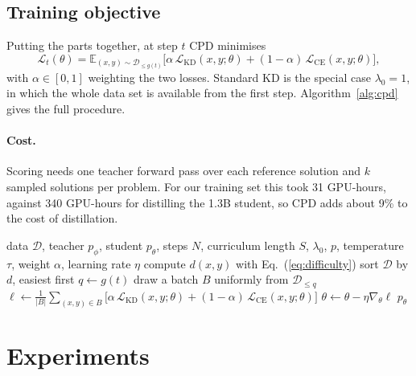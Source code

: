 \documentclass{article} %
\begin{document}
\subsection{Training objective}
\label{sec:objective}

Putting the parts together, at step $t$ CPD minimises
\begin{equation}
\mathcal{L}_t(\theta) = \mathbb{E}_{(x, y) \sim \mathcal{D}_{\le g(t)}} \bigl[ \alpha\, \mathcal{L}_{\mathrm{KD}}(x, y; \theta) + (1 - \alpha)\, \mathcal{L}_{\mathrm{CE}}(x, y; \theta) \bigr],
\label{eq:objective}
\end{equation}
with $\alpha \in [0, 1]$ weighting the two losses.
Standard KD is the special case $\lambda_0 = 1$, in which the whole data set is available from the first step.
Algorithm~\ref{alg:cpd} gives the full procedure.

\paragraph{Cost.}
Scoring needs one teacher forward pass over each reference solution and $k$ sampled solutions per problem.
For our training set this took 31 GPU-hours, against 340 GPU-hours for distilling the 1.3B student, so CPD adds about 9\% to the cost of distillation.

\begin{algorithm}[t]
\caption{Curriculum-Paced Distillation (CPD)}
\label{alg:cpd}
\begin{algorithmic}[1]
\REQUIRE data $\mathcal{D}$, teacher $p_\phi$, student $p_\theta$, steps $N$, curriculum length $S$, $\lambda_0$, $p$, temperature $\tau$, weight $\alpha$, learning rate $\eta$
\STATE compute $d(x, y)$ with Eq.~(\ref{eq:difficulty})
\ENDFOR
\STATE sort $\mathcal{D}$ by $d$, easiest first
\STATE $q \leftarrow g(t)$ 
\STATE draw a batch $B$ uniformly from $\mathcal{D}_{\le q}$
\STATE $\ell \leftarrow \frac{1}{|B|} \sum_{(x, y) \in B} \bigl[ \alpha\, \mathcal{L}_{\mathrm{KD}}(x, y; \theta) + (1 - \alpha)\, \mathcal{L}_{\mathrm{CE}}(x, y; \theta) \bigr]$ 
\STATE $\theta \leftarrow \theta - \eta \nabla_\theta \ell$ 
\ENDFOR
\RETURN $p_\theta$
\end{algorithmic}
\end{algorithm}

\section{Experiments}
\label{sec:experiments}
\end{document}
